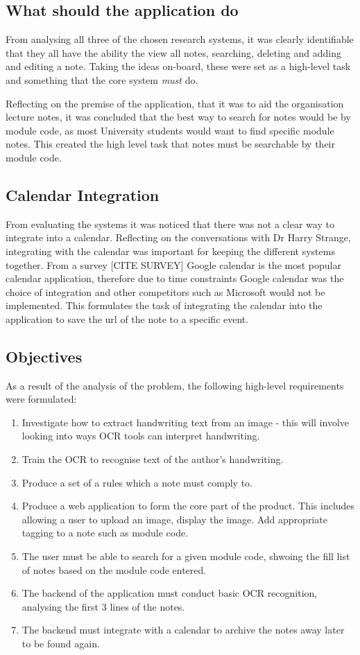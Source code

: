 \subsection{What should the application do}
From analysing all three of the chosen research systems, it was clearly identifiable that they all have the ability the view all notes, searching, deleting and adding and editing a note. Taking the ideas on-board, these were set as a high-level task and something that the core system \textit{must} do.

Reflecting on the premise of the application, that it was to aid the organisation lecture notes, it was concluded that the best way to search for notes would be by module code, as most University students would want to find specific module notes. This created the high level task that notes must be searchable by their module code.

\subsection{Calendar Integration}
From evaluating the systems it was noticed that there was not a clear way to integrate into a calendar. Reflecting on the conversations with Dr Harry Strange, integrating with the calendar was important for keeping the different systems together. From a survey [CITE SURVEY] Google calendar is the most popular calendar application, therefore due to time constraints Google calendar was the choice of integration and other competitors such as Microsoft would not be implemented. This formulates the task of integrating the calendar into the application to save the url of the note to a specific event.

\subsection{Objectives}
As a result of the analysis of the problem, the following high-level requirements were formulated:
\begin{enumerate}
	\item Investigate how to extract handwriting text from an image - this will involve looking into ways OCR tools can interpret handwriting.
	\item Train the OCR to recognise text of the author's handwriting.
	\item Produce a set of a rules which a note must comply to.
	\item Produce a web application to form the core part of the product. This includes allowing a user to upload an image, display the image. Add appropriate tagging to a note such as module code.
	\item The user must be able to search for a given module code, shwoing the fill list of notes based on the module code entered.
	\item The backend of the application must conduct basic OCR recognition, analysing the first 3 lines of the notes.
	\item The backend must integrate with a calendar to archive the notes away later to be found again.
\end{enumerate}


